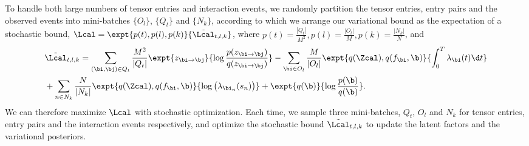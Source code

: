 To handle both large numbers of tensor entries and interaction events, we  randomly partition the tensor entries, entry pairs and the observed events into mini-batches $\{O_l\}$, $\{Q_t\}$ and $\{N_k\}$, according to which we arrange our variational bound as the expectation of a stochastic bound, $\Lcal = \expt{p(t),p(l),p(k)}{\tilde{\Lcal}_{t,l,k}}$, where $p(t) = \frac{|Q_t|}{M^2}, p(l) = \frac{|O_l|}{M}, p(k) = \frac{|N_k|}{N}$, and 
\begin{align}
&\tilde{\Lcal}_{t,l,k} = \sum_{(\bi,\bj) \in Q_t}\frac{M^2}{|Q_t|} \expt{z_{\bi \rightarrow \bj}}{\log\frac{p(z_{\bi \rightarrow \bj})}{q(z_{\bi \rightarrow \bj})}} -\sum_{\bi \in O_l}\frac{M}{|O_l|}\expt{q(\Zcal), q(f_\bi, \b)}{\int_{0}^T \lambda_\bi(t) \d t} \notag\\
&+\sum_{n \in N_k}\frac{N}{|N_k|} \expt{q(\Zcal), q(f_\bi, \b)} {\log\big(\lambda_{\bi_n}(s_n)\big)} + \expt{q(\b)}{\log\frac{p(\b)}{q(\b)}}. \label{eq:st-elbo}
\end{align}
We can therefore maximize $\Lcal$ with stochastic optimization. Each time, we sample three mini-batches, $Q_t$, $O_l$ and $N_k$ for tensor entries, entry pairs and the interaction events respectively, and optimize the stochastic bound $\tilde{\Lcal}_{t,l,k}$ to update the latent factors and the variational posteriors. 

